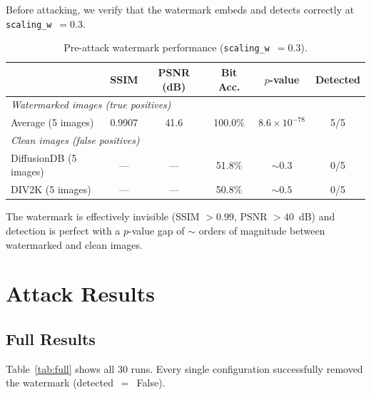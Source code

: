 \documentclass[11pt,a4paper]{article}
\begin{document}
Before attacking, we verify that the watermark embeds and detects
correctly at \texttt{scaling\_w}~$= 0.3$.

\begin{table}[h]
\centering
\caption{Pre-attack watermark performance (\texttt{scaling\_w}~$= 0.3$).}
\label{tab:baseline}
\begin{tabular}{lccccc}
\toprule
& \textbf{SSIM} & \textbf{PSNR (dB)} & \textbf{Bit Acc.} & \textbf{$p$-value} & \textbf{Detected} \\
\midrule
\multicolumn{6}{l}{\textit{Watermarked images (true positives)}} \\
Average (5 images) & 0.9907 & 41.6 & 100.0\% & $8.6 \times 10^{-78}$ & 5/5 \\
\midrule
\multicolumn{6}{l}{\textit{Clean images (false positives)}} \\
DiffusionDB (5 images) & --- & --- & 51.8\% & $\sim 0.3$ & 0/5 \\
DIV2K (5 images)       & --- & --- & 50.8\% & $\sim 0.5$ & 0/5 \\
\bottomrule
\end{tabular}
\end{table}

The watermark is effectively invisible (SSIM $> 0.99$, PSNR $> 40$~dB)
and detection is perfect with a $p$-value gap of $\sim$ orders of
magnitude between watermarked and clean images.

\section{Attack Results}
\label{sec:results}

\subsection{Full Results}

Table~\ref{tab:full} shows all 30 runs. Every single configuration
successfully removed the watermark (detected~$=$~False).
\end{document}
